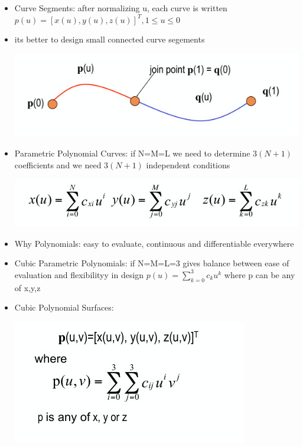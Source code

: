 \documentclass[11pt,a4paper]{article}
\begin{document}
\begin{itemize}
		\item Curve Segments: after normalizing u, each curve is written $p(u)=[x(u),y(u),z(u)]^{T}, 1 \leq u \leq 0$
		\item its better to design small connected curve segements
		\begin{center}
			\includegraphics[scale=0.5]{pictures/connectedcurvesegments.jpg}
		\end{center}
		\item Parametric Polynomial Curves: if N=M=L we need to determine $3(N+1)$ coefficients and we need $3(N+1)$ independent conditions
		\begin{center}
			\includegraphics[scale=0.5]{pictures/parametricpolynomialcurves.jpg}
		\end{center}
		\item Why Polynomials: easy to evaluate, continuous and differentiable everywhere
		\item Cubic Parametric Polynomials: if N=M=L=3 gives balance between ease of evaluation and flexibilityy in design $p(u) = \sum_{k=0}^{3} c_{k} u^{k}$ where p can be any of  x,y,z
		\item Cubic Polynomial Surfaces:
		\begin{center}
			\includegraphics[scale=0.5]{pictures/cubicpolynomialsurfaces.jpg}
		\end{center}
	\end{itemize}
\end{document}
